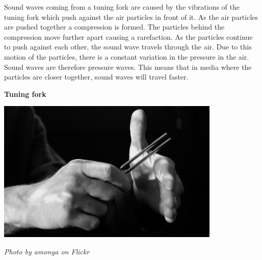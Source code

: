\begin{minipage}{.5\textwidth}
      \label{m38783*id293458}Sound waves coming from a tuning fork are caused by the vibrations of the tuning fork which push against the air particles in front of it. As the air particles are pushed together a compression is formed. The particles behind the compression move further apart causing a rarefaction. As the particles continue to push against each other,
the sound wave travels through the air. Due to this motion of the particles, there is a constant variation in the pressure in the air. Sound waves are therefore pressure waves. This means that in media where the particles are closer together, sound waves will travel faster.
\end{minipage}
\begin{minipage}{.5\textwidth}\begin{center}
\textbf{Tuning fork}\par
    \includegraphics[width=0.8\textwidth]{photos/TuningFork2_Flickr_amonya.jpg}\par
\textit{Photo by amonya on Flickr}
\end{center}
\end{minipage}

